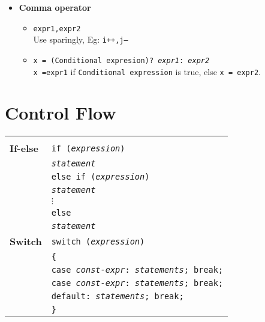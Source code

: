 \begin{multicols*}{3}
\begin{itemize}
\item \textbf{Comma operator}
\begin{itemize}
\item \texttt{expr1,expr2}\\
Use sparingly, Eg: \texttt{i++,j--}\\
\item \texttt{x = (Conditional expresion)? \textit{expr1}: \textit{expr2}}\\
\texttt{x =expr1} if \texttt{Conditional expression} is true, else \texttt{x = expr2}.
\end{itemize}

\end{itemize}

\vfill \null
\columnbreak

\section{Control Flow }

\begin{tabularx}{\linewidth}{l|X}
\hline\\
\textbf{If-else} & \texttt{if (\textit{expression})} \\ &
\texttt{\qquad \textit{statement}} \\ &
\texttt{else if (\textit{expression})} \\ &
\texttt{\qquad \textit{statement}} \\ &
$\vdots$\\ &
\texttt{else} \\ &
\texttt{\qquad \textit{statement}}\\

\hline

\textbf{Switch} & \texttt{switch (\textit{expression})}\\
& \texttt{\{}\\
& \texttt{\qquad case \textit{const-expr}: \textit{statements}; break;}\\
& \texttt{\qquad case \textit{const-expr}: \textit{statements}; break;}\\
& \texttt{\qquad default: \textit{statements}; break;} \\
& \texttt{\}}\\


\end{tabularx}
\end{multicols*}
